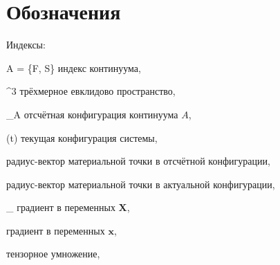\section*{Обозначения}
\setcounter{subsection}{0}
	
	Индексы:
\begin{where}
	\item [A = \{F, S\}] индекс континуума,
\end{where}

\begin{where}
	\item [\mathbb{E}^3] трёхмерное евклидово пространство,
	\item [\kappa_A] отсчётная конфигурация континуума $A$,
	\item [\chi(t)] текущая конфигурация системы,
	\item [\mathbf{X}] радиус-вектор материальной точки в отсчётной конфигурации,
	\item [\mathbf{x}] радиус-вектор материальной точки в актуальной конфигурации,
	\item [\nabla_{\kappa}] градиент в переменных $\mathbf{X}$,
	\item [\nabla] градиент в переменных $\mathbf{x}$,
	\item [\otimes] тензорное умножение,
\end{where}
